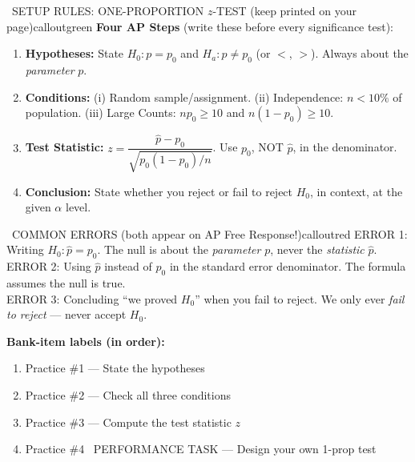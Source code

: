 \documentclass[11pt]{article}
\begin{document}


\begin{callout}{\IconBook\ SETUP RULES: ONE-PROPORTION \(z\)-TEST (keep printed on your page)}{calloutgreen}
\textbf{Four AP Steps} (write these before every significance test):
\begin{enumerate}[leftmargin=2.1em,itemsep=1pt,topsep=3pt]
  \item \textbf{Hypotheses:} State \(H_0\!: p = p_0\) and \(H_a\!: p \neq p_0\) (or \(<\), \(>\)). Always about the \textit{parameter} \(p\).
  \item \textbf{Conditions:} (i) Random sample/assignment. (ii) Independence: \(n < 10\%\) of population. (iii) Large Counts: \(np_0 \geq 10\) and \(n(1-p_0) \geq 10\).
  \item \textbf{Test Statistic:} \(z = \dfrac{\hat{p} - p_0}{\sqrt{p_0(1-p_0)/n}}\). Use \(p_0\), NOT \(\hat{p}\), in the denominator.
  \item \textbf{Conclusion:} State whether you reject or fail to reject \(H_0\), in context, at the given \(\alpha\) level.
\end{enumerate}
\end{callout}

\begin{callout}{\IconWarn\ COMMON ERRORS (both appear on AP Free Response!)}{calloutred}
ERROR 1: Writing \(H_0\!: \hat{p} = p_0\). The null is about the \textit{parameter} \(p\), never the \textit{statistic} \(\hat{p}\).\\
ERROR 2: Using \(\hat{p}\) instead of \(p_0\) in the standard error denominator. The formula assumes the null is true.\\
ERROR 3: Concluding ``we proved \(H_0\)'' when you fail to reject. We only ever \textit{fail to reject} --- never accept \(H_0\).
\end{callout}


\textbf{Bank-item labels (in order):}
\begin{enumerate}[leftmargin=1.6em,itemsep=2pt,topsep=2pt]
  \item Practice \#1 --- State the hypotheses
  \item Practice \#2 --- Check all three conditions
  \item Practice \#3 --- Compute the test statistic \(z\)
  \item Practice \#4 \IconStar\ PERFORMANCE TASK --- Design your own 1-prop test
\end{enumerate}
\end{document}
